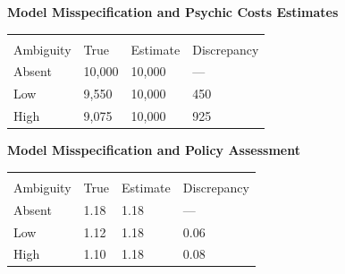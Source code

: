 \begin{frame}\textbf{Model Misspecification and Psychic Costs Estimates}\vspace{0.3cm}


\begin{center}
\begin{tabular}{C{1.8cm} C{2cm} C{2cm}  C{2cm}}\toprule
                        &   \\[-2ex]
     Ambiguity          & True & Estimate  & Discrepancy\\\midrule
    Absent & 10,000 & 10,000  & ---\\
    Low    &  9,550 & 10,000  &  450  \\
    High   &  9,075 & 10,000  &  925\\\bottomrule
\end{tabular}
\end{center}

\end{frame}
\begin{frame}\textbf{Model Misspecification and Policy Assessment}\vspace{0.3cm}


\begin{center}
\begin{tabular}{C{1.8cm} C{2cm} C{2cm} C{2cm}}\toprule
                        &   \\[-2ex]
     Ambiguity          &  True & Estimate & Discrepancy \\\midrule
    Absent & 1.18 & 1.18 & ---\\
    Low    & 1.12 & 1.18 &  0.06\\
    High   & 1.10 & 1.18 & 0.08 \\\bottomrule
\end{tabular}
\end{center}


\end{frame}